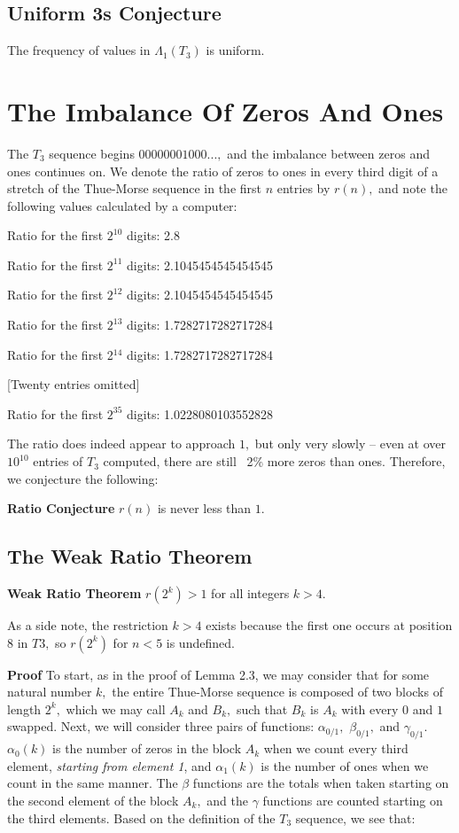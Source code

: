 \documentclass{article}
\begin{document}
\subsection{Uniform 3s Conjecture}
The frequency of values in $\Lambda{_1(T_3)}$ is uniform.

\section{The Imbalance Of Zeros And Ones}

The $T_3$ sequence begins $00000001000...,$ and the imbalance between zeros and ones continues on. We denote the ratio of zeros to ones in every third digit of a stretch of the Thue-Morse sequence in the first $n$ entries by $r(n),$ and note the following values calculated by a computer:

Ratio for the first $2^{10}$ digits: 2.8

Ratio for the first $2^{11}$ digits: 2.1045454545454545

Ratio for the first $2^{12}$ digits: 2.1045454545454545

Ratio for the first $2^{13}$ digits: 1.7282717282717284

Ratio for the first 2$^{14}$ digits: 1.7282717282717284

[Twenty entries omitted]

Ratio for the first $2^{35}$ digits: 1.0228080103552828

The ratio does indeed appear to approach $1,$ but only very slowly -- even at over $10^{10}$ entries of $T_3$ computed, there are still ~2\% more zeros than ones. Therefore, we conjecture the following:

\textbf{Ratio Conjecture} $r(n)$ is never less than $1.$

\subsection{The Weak Ratio Theorem}

\textbf{Weak Ratio Theorem} $r(2^k) > 1$ for all integers $k > 4.$

As a side note, the restriction $k > 4$ exists because the first one occurs at position $8$ in $T3,$ so $r(2^k)$ for $n < 5$ is undefined.

\textbf{Proof} To start, as in the proof of Lemma 2.3, we may consider that for some natural number $k,$ the entire Thue-Morse sequence is composed of two blocks of length $2^k,$ which we may call $A_k$ and $B_k,$ such that $B_k$ is $A_k$ with every $0$ and $1$ swapped. Next, we will consider three pairs of functions: $\alpha_{0/1},$ $\beta_{0/1},$ and $\gamma_{0/1}.$ $\alpha_0(k)$ is the number of zeros in the block $A_k$ when we count every third element, \emph{starting from element 1}, and $\alpha_1(k)$ is the number of ones when we count in the same manner. The $\beta$ functions are the totals when taken starting on the second element of the block $A_k,$ and the $\gamma$ functions are counted starting on the third elements. Based on the definition of the $T_3$ sequence, we see that:
\end{document}
